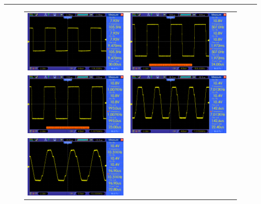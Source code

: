 \documentclass[14pt,a4paper]{extarticle}
\begin{document}
\noindent\rule{\textwidth}{0.5pt}
\begin{figure}[H]
\centering
\begin{tabular}{ccc}
    \includegraphics[width=.49\linewidth]{imgs/square100.png}&
    \includegraphics[width=.49\linewidth]{imgs/square500.png}\\
    \includegraphics[width=.49\linewidth]{imgs/square1k.png}&
    \includegraphics[width=.49\linewidth]{imgs/square7k.png}\\
    \includegraphics[width=.49\linewidth]{imgs/square10k.png}&        

\end{tabular}
\end{figure}
\end{document}
